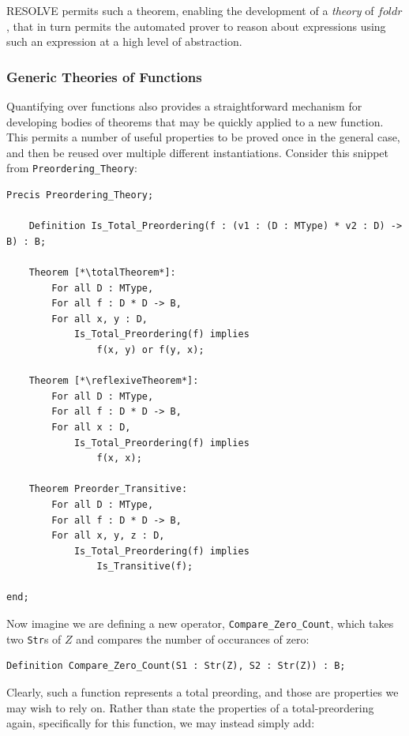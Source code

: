 RESOLVE permits such a theorem, enabling the development of a \emph{theory} of $foldr$, that in turn permits the automated prover to reason about expressions using such an expression at a high level of abstraction.

		\subsubsection{Generic Theories of Functions\label{genericTheoriesFunctions}}

Quantifying over functions also provides a straightforward mechanism for developing bodies of theorems that may be quickly applied to a new function.  This permits a number of useful properties to be proved once in the general case, and then be reused over multiple different instantiations.  Consider this snippet from \texttt{Preordering\_Theory}:

\newcommand{\reflexiveTheorem}{Preorder\_Reflexive}
\newcommand{\totalTheorem}{Total\_Preorder\_Total}

\begin{lstlisting}
Precis Preordering_Theory;

	Definition Is_Total_Preordering(f : (v1 : (D : MType) * v2 : D) -> B) : B;

	Theorem [*\totalTheorem*]:
		For all D : MType,
		For all f : D * D -> B,
		For all x, y : D,
			Is_Total_Preordering(f) implies
				f(x, y) or f(y, x);

	Theorem [*\reflexiveTheorem*]:
		For all D : MType,
		For all f : D * D -> B,
		For all x : D,
			Is_Total_Preordering(f) implies
				f(x, x);

	Theorem Preorder_Transitive:
		For all D : MType, 
		For all f : D * D -> B,
		For all x, y, z : D,
			Is_Total_Preordering(f) implies
				Is_Transitive(f);

end;
\end{lstlisting}

Now imagine we are defining a new operator, \texttt{Compare\_Zero\_Count}, which takes two \texttt{Str}s of $Z$ and compares the number of occurances of zero:

\begin{lstlisting}
Definition Compare_Zero_Count(S1 : Str(Z), S2 : Str(Z)) : B;
\end{lstlisting}

Clearly, such a function represents a total preording, and those are properties we may wish to rely on.  Rather than state the properties of a total-preordering again, specifically for this function, we may instead simply add:


